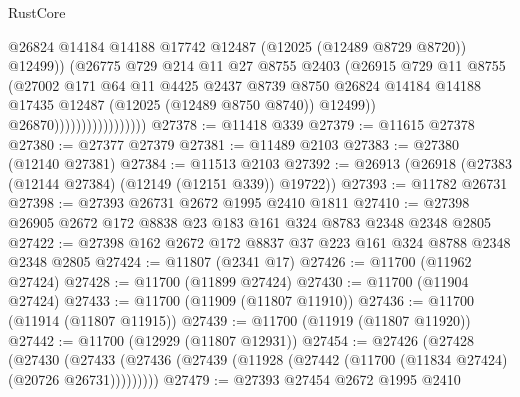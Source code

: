 \begin{lexlean}{RustCore}
\begin{coremodule}
                                        @26824
                                        @14184
                                        @14188
                                        @17742
                                        @12487
                                        (@12025 (@12489 @8729 @8720))
                                        @12499))
                                    (@26775
                                      @729
                                      @214
                                      @11
                                      @27
                                      @8755
                                      @2403
                                      (@26915
                                        @729
                                        @11
                                        @8755
                                        (@27002
                                          @171
                                          @64
                                          @11
                                          @4425
                                          @2437
                                          @8739
                                          @8750
                                          @26824
                                          @14184
                                          @14188
                                          @17435
                                          @12487
                                          (@12025 (@12489 @8750 @8740))
                                          @12499))
                                      @26870)))))))))))))))))
@27378 := @11418 @339
@27379 := @11615 @27378
@27380 := @27377 @27379
@27381 := @11489 @2103
@27383 := @27380 (@12140 @27381)
@27384 := @11513 @2103
@27392 := @26913 (@26918 (@27383 (@12144 @27384) (@12149 (@12151 @339)) @19722))
@27393 := @11782 @26731
@27398 := @27393 @26731 @2672 @1995 @2410 @1811
@27410 := @27398 @26905 @2672 @172 @8838 @23 @183 @161 @324 @8783 @2348 @2348 @2805
@27422 := @27398 @162 @2672 @172 @8837 @37 @223 @161 @324 @8788 @2348 @2348 @2805
@27424 := @11807 (@2341 @17)
@27426 := @11700 (@11962 @27424)
@27428 := @11700 (@11899 @27424)
@27430 := @11700 (@11904 @27424)
@27433 := @11700 (@11909 (@11807 @11910))
@27436 := @11700 (@11914 (@11807 @11915))
@27439 := @11700 (@11919 (@11807 @11920))
@27442 := @11700 (@12929 (@11807 @12931))
@27454 := @27426
    (@27428
      (@27430
        (@27433 (@27436 (@27439 (@11928 (@27442 (@11700 (@11834 @27424) (@20726 @26731)))))))))
@27479 := @27393
    @27454
    @2672
    @1995
    @2410

\end{coremodule}
\end{lexlean}
